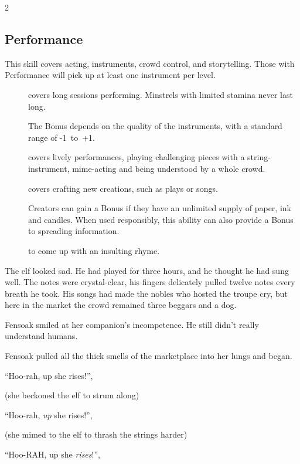\begin{multicols}{2}
\subsection{Performance}

This \gls{skill} covers acting, instruments, crowd control, and storytelling.
Those with Performance will pick up at least one instrument per level.

\begin{description}
  \item[]
    covers long sessions performing.
    Minstrels with limited stamina never last long.

    The Bonus depends on the quality of the instruments, with a standard range of -1~to~+1.
  \item[]
    covers lively performances, playing challenging pieces with a string-instrument, mime-acting and being understood by a whole crowd.
  \item[]
    covers crafting new creations, such as plays or songs.

    Creators can gain a Bonus if they have an unlimited supply of paper, ink and candles.
    When used responsibly, this ability can also provide a Bonus to spreading information.
  \item[]
    to come up with an insulting rhyme.
\end{description}

\begin{exampletext}
  The elf looked sad.
  He had played for three hours, and he thought he had sung well.
  The notes were crystal-clear, his fingers delicately pulled twelve notes every breath he took.
  His songs had made the nobles who hosted the troupe cry, but here in the market the crowd remained three beggars and a dog.

  Fensoak smiled at her companion's incompetence.
  He still didn't really understand humans.

  Fensoak pulled all the thick smells of the marketplace into her lungs and began.

  ``Hoo-rah, up she rises!'',

  (she beckoned the elf to strum along)

  ``Hoo-rah, \emph{up} she rises!'',

  (she mimed to the elf to thrash the strings harder)

  ``Hoo-RAH, up she \emph{rises}!'',


\end{exampletext}
\end{multicols}
